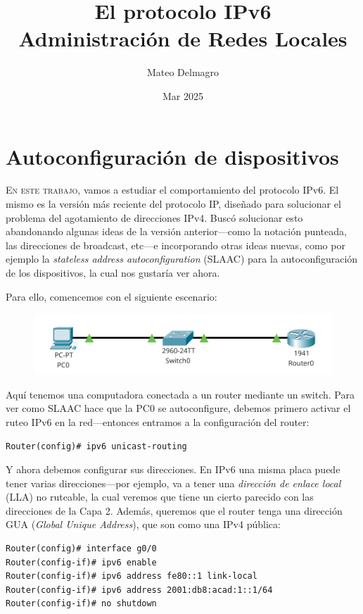 \documentclass[a4paper,10pt]{corsage}
\title{\Huge{}El protocolo IPv6\\\large{}Administración de Redes Locales}
\author{Mateo Delmagro}
\date{Mar 2025}
\makeatletter
\newcommand{\devname}[1]{\textsc{#1}}
\newcommand*{\@doendeq}{%
	\everypar{{\setbox\z@\lastbox}\everypar{}}%
}
\newenvironment{console}{%
	\begin{tcolorbox}[
		left skip=1cm,
		right skip=1Cm,
		left=8pt,
		right=8pt,
		top=2.5\parskip,
		bottom=2\parskip,
		colback=gray!10,
		colframe=gray!40,
		boxrule=0pt,
		leftrule=4pt,
		sharp corners=all,
		fontupper=\ttfamily\flushleft\footnotesize
	]%
}{%
	\end{tcolorbox}%
	\ignorespacesafterend\par\noindent\aftergroup\@doendeq%
}
\makeatother
\begin{document}
\maketitle
\cleardoublepage

\newcommand{\scenarioheight}{5\baselineskip}
\chapter{Autoconfiguración de dispositivos}
	\lettrine{E}{n este trabajo}, vamos a estudiar el comportamiento del protocolo IPv6.  El mismo es la versión más reciente del protocolo IP, diseñado para solucionar el problema del agotamiento de direcciones IPv4.  Buscó solucionar esto abandonando algunas ideas de la versión anterior---como la notación punteada, las direcciones de broadcast, etc---e incorporando otras ideas nuevas, como por ejemplo la \textit{stateless address autoconfiguration} (SLAAC) para la autoconfiguración de los dispositivos, la cual nos gustaría ver ahora.

	Para ello, comencemos con el siguiente escenario:
	\begin{figure}[h]
		\centering
		\includegraphics[height=\scenarioheight]{slaac-quiet}
	\end{figure}

	Aquí tenemos una computadora conectada a un router mediante un switch.  Para ver como SLAAC hace que la \devname{PC0} se autoconfigure, debemos primero activar el ruteo IPv6 en la red---entonces entramos a la configuración del router:
	\begin{console}
		\verb|Router(config)# ipv6 unicast-routing|
	\end{console}

	Y ahora debemos configurar sus direcciones.  En IPv6 una misma placa puede tener varias direcciones---por ejemplo, va a tener una \textit{dirección de enlace local} (LLA) no ruteable, la cual veremos que tiene un cierto parecido con las direcciones de la Capa 2.  Además, queremos que el router tenga una dirección GUA (\textit{Global Unique Address}), que son como una IPv4 pública:
	\begin{console}
		\begin{verbatim}Router(config)# interface g0/0
Router(config-if)# ipv6 enable
Router(config-if)# ipv6 address fe80::1 link-local
Router(config-if)# ipv6 address 2001:db8:acad:1::1/64
Router(config-if)# no shutdown\end{verbatim}
	\end{console}
\end{document}

